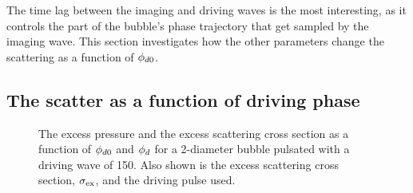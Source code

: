 
The time lag between the imaging and driving waves is the most interesting, 
as it controls the part of the bubble's phase trajectory that get sampled by the imaging wave.
This section investigates how the other parameters change the scattering as a function of ${\phi_{d0}}$.


\subsection{The scatter as a function of driving phase} \label{sec:excess_phase}


\begin{figure}
 \centering
  
  \caption{
The excess pressure and the excess scattering cross section as a function of ${\phi_{d0}}$ and ${\phi_d}$
for a \unit{2}\micro\metre-diameter bubble pulsated with a driving wave of \unit{150}\kilo\pascal.
Also shown is the excess scattering cross section, $\sigma_\textrm{ex}$, and the driving pulse used.
  }
 \label{fig:excess_vs_phase}
\end{figure}



